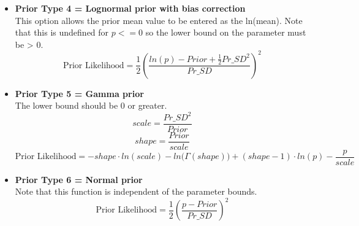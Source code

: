 \begin{itemize}
	\item \textbf{Prior Type 4 = Lognormal prior with bias correction} \\ 
	This option allows the prior mean value to be entered as the ln(mean). Note that this is undefined for $p <= 0$ so the lower bound on the parameter must be > 0.
	\begin{equation}
		\text{Prior Likelihood} = \frac{1}{2} \left(\frac{ln(p)-Prior + \frac{1}{2}{Pr\_SD}^2}{Pr\_SD}\right)^2
	\end{equation}
	
	\item \textbf{Prior Type 5 = Gamma prior} \\ 
	The lower bound should be 0 or greater.
	\begin{equation}
		scale = \frac{{Pr\_SD}^2}{Prior}
	\end{equation}
	\begin{equation}
		shape = \frac{Prior}{scale}
	\end{equation}
	\begin{equation}
		\text{Prior Likelihood} = -shape \cdot ln(scale) - ln\big(\Gamma(shape)\big) + (shape - 1) \cdot ln(p) - \frac{p}{scale}
	\end{equation}
	
	\item \textbf{Prior Type 6 = Normal prior} \\ 
	Note that this function is independent of the parameter bounds.
	\begin{equation}
		\text{Prior Likelihood} = \frac{1}{2} \left(\frac{p - Prior}{Pr\_SD}\right)^2
	\end{equation}
\end{itemize}




\pagebreak